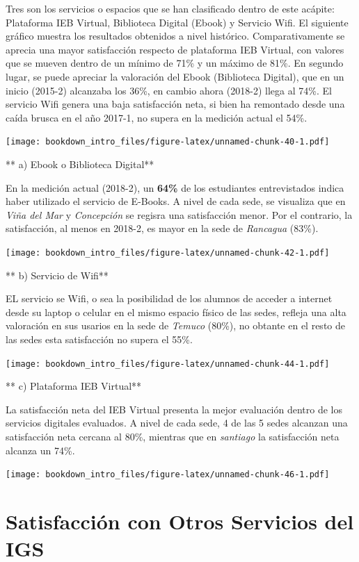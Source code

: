\documentclass[]{book}
\begin{document}
Tres son los servicios o espacios que se han clasificado dentro de este
acápite: Plataforma IEB Virtual, Biblioteca Digital (Ebook) y Servicio
Wifi. El siguiente gráfico muestra los resultados obtenidos a nivel
histórico. Comparativamente se aprecia una mayor satisfacción respecto
de plataforma IEB Virtual, con valores que se mueven dentro de un mínimo
de 71\% y un máximo de 81\%. En segundo lugar, se puede apreciar la
valoración del Ebook (Biblioteca Digital), que en un inicio (2015-2)
alcanzaba los 36\%, en cambio ahora (2018-2) llega al 74\%. El servicio
Wifi genera una baja satisfacción neta, si bien ha remontado desde una
caída brusca en el año 2017-1, no supera en la medición actual el 54\%.

\texttt{[image: bookdown\_intro\_files/figure-latex/unnamed-chunk-40-1.pdf]}

** a) Ebook o Biblioteca Digital**

En la medición actual (2018-2), un \textbf{64\%} de los estudiantes
entrevistados indica haber utilizado el servicio de E-Books. A nivel de
cada sede, se visualiza que en \emph{Viña del Mar} y \emph{Concepción}
se regisra una satisfacción menor. Por el contrario, la satisfacción, al
menos en 2018-2, es mayor en la sede de \emph{Rancagua} (83\%).

\texttt{[image: bookdown\_intro\_files/figure-latex/unnamed-chunk-42-1.pdf]}

** b) Servicio de Wifi**

EL servicio se Wifi, o sea la posibilidad de los alumnos de acceder a
internet desde su laptop o celular en el mismo espacio físico de las
sedes, refleja una alta valoración en sus usarios en la sede de
\emph{Temuco} (80\%), no obtante en el resto de las sedes esta
satisfacción no supera el 55\%.

\texttt{[image: bookdown\_intro\_files/figure-latex/unnamed-chunk-44-1.pdf]}

** c) Plataforma IEB Virtual**

La satisfacción neta del IEB Virtual presenta la mejor evaluación dentro
de los servicios digitales evaluados. A nivel de cada sede, 4 de las 5
sedes alcanzan una satisfacción neta cercana al 80\%, mientras que en
\emph{santiago} la satisfacción neta alcanza un 74\%.

\texttt{[image: bookdown\_intro\_files/figure-latex/unnamed-chunk-46-1.pdf]}

\section{Satisfacción con Otros Servicios del
IGS}\label{satisfaccion-con-otros-servicios-del-igs}
\end{document}
